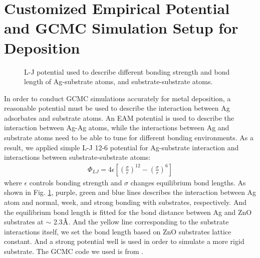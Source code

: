 \section{Customized Empirical Potential and GCMC Simulation Setup for Deposition}

\begingroup
\begin{figure}[!ht]
  \centering
  \caption[Lennard-Jones potential used to describe different bonding strength and bond length of Ag-substrate atoms, and substrate-substrate atoms]{\ac{L-J} potential used to describe different bonding strength and bond length of Ag-substrate atoms, and substrate-substrate atoms.}
  \label{Chap:Ag/ZnO:fig2}
\end{figure}
\endgroup

In order to conduct \ac{GCMC} simulations accurately for metal deposition, a reasonable potential must be used to describe the interaction between Ag adsorbates and substrate atoms. An \ac{EAM} potential \cite{williams2016modeling} is used to describe the interaction between Ag-Ag atoms, while the interactions between Ag and substrate atoms need to be able to tune for different bonding environments. As a result, we applied simple \ac{L-J} 12-6 potential \cite{jones1924determination} for Ag-substrate interaction and interactions between substrate-substrate atoms:
\begin{align}
 \Phi_{LJ} = 4\epsilon \left[ (\frac{\sigma}{r})^{12} - (\frac{\sigma}{r})^6\right]
 \label{Chap:Ag/ZnO:eq:LJ}
\end{align}
where $\epsilon$ controls bonding strength and $\sigma$ changes equilibrium bond lengths. As shown in Fig. \ref{Chap:Ag/ZnO:fig2}, purple, green and blue lines describes the interaction between Ag atom and normal, week, and strong bonding with substrates, respectively. And the equilibrium bond length is fitted for the bond distance between Ag and ZnO substrates at $\sim$ 2.3$\mbox{\normalfont\AA}$. And the yellow line corresponding to the substrate interactions itself, we set the bond length based on ZnO substrates lattice constant. And a strong potential well is used in order to simulate a more rigid substrate. The \ac{GCMC} code we used is from \cite{sina2017mapp}.

